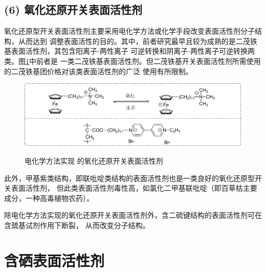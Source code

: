 \documentclass[bachelor,fandolfonts,replaceperiod]{jnuthesis}
\begin{document}
    \subsection*{(6) 氧化还原开关表面活性剂}
    氧化还原型开关表面活性剂主要采用电化学方法或化学手段改变表面活性剂分子结构，从而达到
    调整表面活性的目的。其中，前者研究最早且较为成熟的是二茂铁基表面活性剂，其包含阳离子-两性离子
    可逆转换和阴离子-两性离子可逆转换两类\cite{李云霞2011}。图\ref{fig:switchable-redox-cp2fe}中前者是
    一类二茂铁基表面活性剂。但二茂铁基开关表面活性剂所需使用的二茂铁基团价格对该类表面活性剂的广泛
    使用有所限制。
    \begin{figure}[htbp]
        \centering
        \includegraphics[width= \textwidth]{Figure/switchable-cp2fe.pdf}\\
        \caption{电化学方法实现 的氧化还原开关表面活性剂}\label{fig:switchable-redox-cp2fe}
    \end{figure}
    
    此外，甲基紫类结构，即联吡啶类结构的表面活性剂也是一类良好的氧化还原型开关表面活性剂，
    但此类表面活性剂毒性高，如氯化二甲基联吡啶（即百草枯主要成分，一种高毒植物农药）。
    
    除电化学方法实现的氧化还原开关表面活性剂外，含二硫键结构的表面活性剂可在含巯基试剂作用下断裂，
    从而改变分子结构。
    
%    
    
    
    
    \section{含硒表面活性剂}
    
\end{document}
